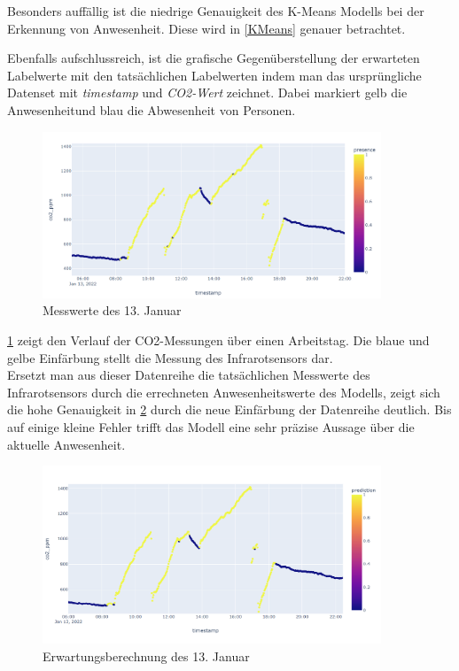 Besonders auffällig ist die niedrige Genauigkeit des K-Means Modells bei der Erkennung von Anwesenheit. Diese 
wird in \ref{KMeans} genauer betrachtet.
\newpage

Ebenfalls aufschlussreich, ist die grafische Gegenüberstellung der erwarteten Labelwerte mit den tatsächlichen Labelwerten
indem man das ursprüngliche Datenset mit \textit{timestamp} und \textit{CO2-Wert} zeichnet. Dabei markiert gelb 
die Anwesenheitund blau die Abwesenheit von Personen.

\begin{figure}[h]
    \centering
    \includegraphics[width=0.9\textwidth]{pic/nov23_actual.png}
    \caption{Messwerte des 13. Januar}
    \label{fig:nov23}
\end{figure}

\ref{fig:nov23} zeigt den Verlauf der CO2-Messungen über einen Arbeitstag. Die blaue und gelbe Einfärbung stellt
die Messung des Infrarotsensors dar.\\ 
Ersetzt man aus dieser Datenreihe die tatsächlichen Messwerte des Infrarotsensors durch die errechneten 
Anwesenheitswerte des Modells, zeigt sich die hohe Genauigkeit in \ref{fig:nov23_pred} durch die neue Einfärbung 
der Datenreihe deutlich. 
Bis auf einige kleine Fehler trifft das Modell eine sehr präzise Aussage über die aktuelle Anwesenheit.

\begin{figure}[h]
    \centering
    \includegraphics[width=0.9\textwidth]{pic/nov23_predicted.png}
    \caption{Erwartungsberechnung des 13. Januar}
    \label{fig:nov23_pred}
\end{figure}


